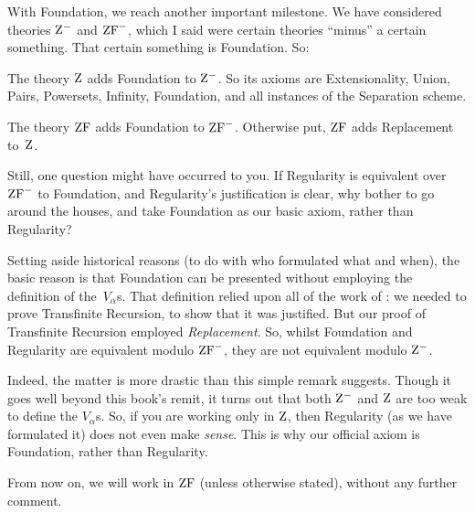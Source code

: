 \documentclass[../../../include/open-logic-section]{subfiles}
\begin{document}

With Foundation, we reach another important milestone. We have
considered theories $\mathrm{Z}^{-}$ and $\mathrm{ZF}^{-}$, which I said were
certain theories ``minus'' a certain something. That certain something
is Foundation. So:

\begin{defn}
The theory $\mathrm{Z}$ adds Foundation to $\mathrm{Z}^{-}$. So its axioms are
Extensionality, Union, Pairs, Powersets, Infinity, Foundation, and all
instances of the Separation scheme.

The theory $\mathrm{ZF}$ adds Foundation to $\mathrm{ZF}^{-}$. Otherwise put, $\mathrm{ZF}$
adds Replacement to~$\mathrm{Z}$.
\end{defn}

Still, one question might have occurred to you. If Regularity is
equivalent over $\mathrm{ZF}^{-}$ to Foundation, and Regularity's
justification is clear, why bother to go around the houses, and take
Foundation as our basic axiom, rather than Regularity? 

Setting aside historical reasons (to do with who formulated what and
when), the basic reason is that Foundation can be presented without
employing the definition of the~$V_\alpha$s. That definition relied
upon all of the work of : we
needed to prove Transfinite Recursion, to show that it was justified.
But our proof of Transfinite Recursion employed \emph{Replacement}.
So, whilst Foundation and Regularity are equivalent modulo $\mathrm{ZF}^{-}$,
they are not equivalent modulo $\mathrm{Z}^{-}$. 

Indeed, the matter is more drastic than this simple remark suggests.
Though it goes well beyond this book's remit, it turns out that both
$\mathrm{Z}^{-}$ and $\mathrm{Z}$ are too weak to define the $V_\alpha$s. So, if you
are working only in $\mathrm{Z}$, then Regularity (as we have formulated it)
does not even make \emph{sense}. This is why our official axiom is
Foundation, rather than Regularity. 

From now on, we will work in $\mathrm{ZF}$ (unless otherwise stated), without
any further comment. 
\end{document}
